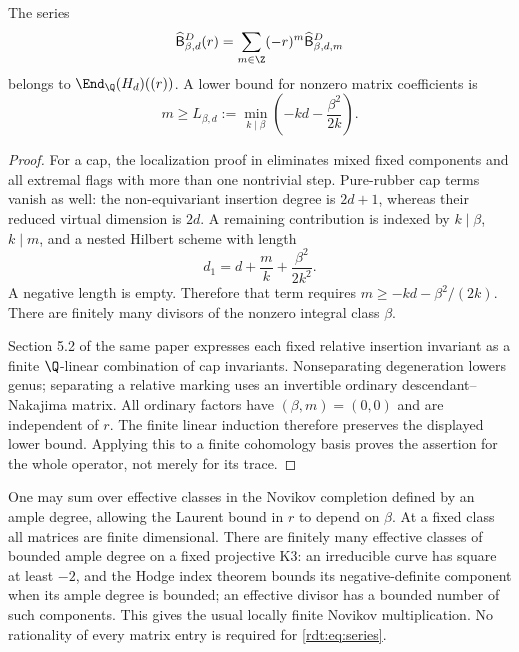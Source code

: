 \begin{proposition}\label{rdt:prop:Laurent}
The series
\begin{equation}\label{rdt:eq:series}
 \widehat{\mathsf B}^D_{\beta,d}(r)=\sum_{m\in\Z}(-r)^m\widehat{\mathsf B}^D_{\beta,d,m}
\end{equation}
belongs to $\End_\Q(H_d)((r))$. A lower bound for nonzero matrix
coefficients is
\begin{equation}\label{rdt:eq:lower}
 m\ge L_{\beta,d}:=\min_{k\mid\beta}
       \left(-kd-\frac{\beta^2}{2k}\right).
\end{equation}
\end{proposition}
\begin{proof}
For a cap, the localization proof in \cite[\S\S4.3--5.3]{OberdieckMC}
eliminates mixed fixed components and all extremal flags with more
than one nontrivial step. Pure-rubber cap terms vanish as well:
the non-equivariant insertion degree is $2d+1$, whereas their
reduced virtual dimension is $2d$. A remaining contribution is indexed by
$k\mid\beta$, $k\mid m$, and a nested Hilbert scheme with length
\[
 d_1=d+\frac{m}{k}+\frac{\beta^2}{2k^2}.
\]
A negative length is empty. Therefore that term requires
$m\ge-kd-\beta^2/(2k)$. There are finitely many divisors of the
nonzero integral class $\beta$.

Section 5.2 of the same paper expresses each fixed relative insertion
invariant as a finite $\Q$-linear combination of cap invariants.
Nonseparating degeneration lowers genus; separating a relative marking
uses an invertible ordinary descendant--Nakajima matrix. All ordinary
factors have $(\beta,m)=(0,0)$ and are independent of $r$. The finite
linear induction therefore preserves the displayed lower bound.
Applying this to a finite cohomology basis proves the assertion for
the whole operator, not merely for its trace.
\end{proof}

One may sum over effective classes in the Novikov completion defined
by an ample degree, allowing the Laurent bound in $r$ to depend on
$\beta$. At a fixed class all matrices are finite dimensional. There
are finitely many effective classes of bounded ample degree on a fixed
projective K3: an irreducible curve has square at least $-2$, and the
Hodge index theorem bounds its negative-definite component when its
ample degree is bounded; an effective divisor has a bounded number of
such components. This gives the usual locally finite Novikov
multiplication. No rationality of every matrix entry is required for
\eqref{rdt:eq:series}.

